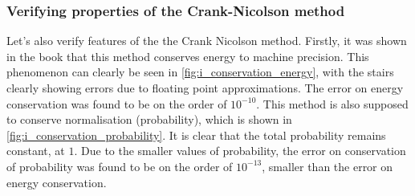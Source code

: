 \subsubsection{Verifying properties of the Crank-Nicolson method}
\label{sec:crank}

Let's also verify features of the the Crank Nicolson method. Firstly, it was shown in the book \cite{physnumbook} that this method conserves energy to machine precision. This phenomenon can clearly be seen in \autoref{fig:i_conservation_energy}, with the stairs clearly showing errors due to floating point approximations. The error on energy conservation was found to be on the order of \(10^{-10}\). This method is also supposed to conserve normalisation (probability), which is shown in \autoref{fig:i_conservation_probability}. It is clear that the total probability remains constant, at \(1\). Due to the smaller values of probability, the error on conservation of probability was found to be on the order of \(10^{-13}\), smaller than the error on energy conservation.

